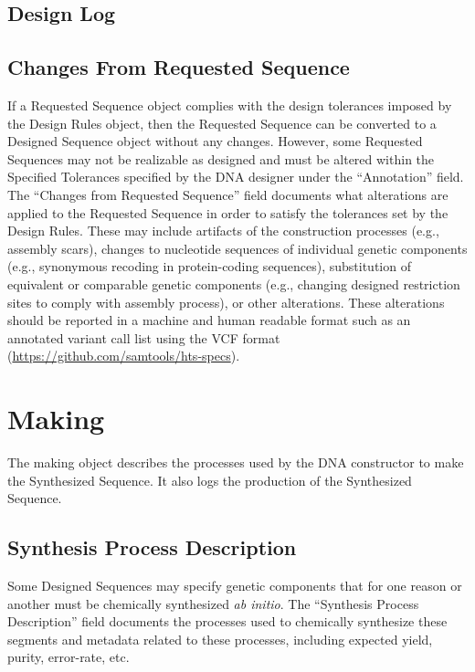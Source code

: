 \documentclass[12pt,letterpaper,english]{article}
\begin{document}
\subsection{Design Log}


\subsection{Changes From Requested Sequence}
If a Requested Sequence object complies with the design tolerances imposed by the Design Rules object, then the Requested Sequence can be converted to a Designed Sequence object without any changes. However, some Requested Sequences may not be realizable as designed and must be altered within the Specified Tolerances specified by the DNA designer under the “Annotation” field. The “Changes from Requested Sequence” field documents what alterations are applied to the Requested Sequence in order to satisfy the tolerances set by the Design Rules. These may include artifacts of the construction processes (e.g., assembly scars), changes to nucleotide sequences of individual genetic components (e.g., synonymous recoding in protein-coding sequences), substitution of equivalent or comparable genetic components (e.g., changing designed restriction sites to comply with assembly process), or other alterations. These alterations should be reported in a machine and human readable format such as an annotated variant call list using the VCF format (\url{https://github.com/samtools/hts-specs}). \par

\section{Making}

The making object describes the processes used by the DNA constructor to make the Synthesized Sequence. It also logs the production of the Synthesized Sequence. \par

\subsection{Synthesis Process Description}
Some Designed Sequences may specify genetic components that for one reason or another must be chemically synthesized \textit{ab initio}. The “Synthesis Process Description” field documents the processes used to chemically synthesize these segments and metadata related to these processes, including expected yield, purity, error-rate, etc. \par
\end{document}

